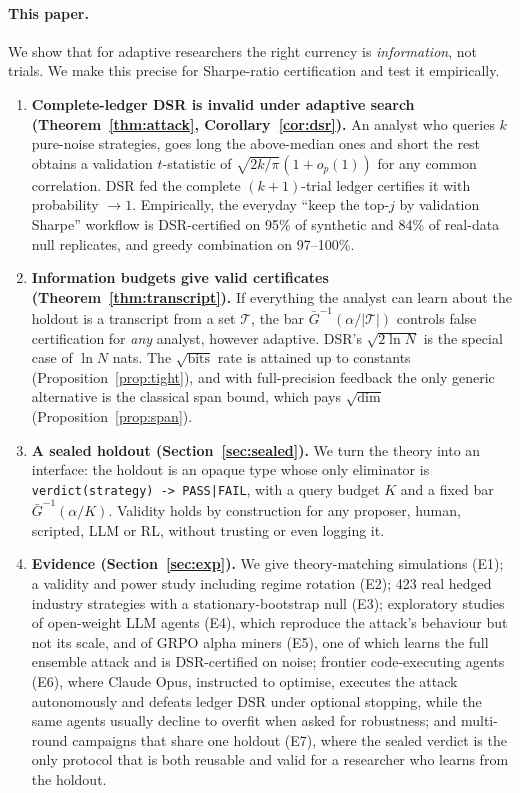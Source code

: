\documentclass[11pt]{article}
\theoremstyle{definition}
\theoremstyle{remark}
\newcommand{\cT}{\mathcal{T}}
\begin{document}
\paragraph{This paper.} We show that for adaptive researchers the right currency is \emph{information}, not trials. We make this precise for Sharpe-ratio certification and test it empirically.
\begin{enumerate}[leftmargin=*,itemsep=2pt]
\item \textbf{Complete-ledger DSR is invalid under adaptive search (Theorem~\ref{thm:attack}, Corollary~\ref{cor:dsr}).} An analyst who queries $k$ pure-noise strategies, goes long the above-median ones and short the rest obtains a validation $t$-statistic of $\sqrt{2k/\pi}(1+o_p(1))$ for any common correlation. DSR fed the complete $(k{+}1)$-trial ledger certifies it with probability $\to1$. Empirically, the everyday ``keep the top-$j$ by validation Sharpe'' workflow is DSR-certified on 95\% of synthetic and 84\% of real-data null replicates, and greedy combination on 97--100\%.
\item \textbf{Information budgets give valid certificates (Theorem~\ref{thm:transcript}).} If everything the analyst can learn about the holdout is a transcript from a set $\cT$, the bar $\bar G^{-1}(\alpha/|\cT|)$ controls false certification for \emph{any} analyst, however adaptive. DSR's $\sqrt{2\ln N}$ is the special case of $\ln N$ nats. The $\sqrt{\text{bits}}$ rate is attained up to constants (Proposition~\ref{prop:tight}), and with full-precision feedback the only generic alternative is the classical span bound, which pays $\sqrt{\dim}$ (Proposition~\ref{prop:span}).
\item \textbf{A sealed holdout (Section~\ref{sec:sealed}).} We turn the theory into an interface: the holdout is an opaque type whose only eliminator is \texttt{verdict(strategy) -> PASS|FAIL}, with a query budget $K$ and a fixed bar $\bar G^{-1}(\alpha/K)$. Validity holds by construction for any proposer, human, scripted, LLM or RL, without trusting or even logging it.
\item \textbf{Evidence (Section~\ref{sec:exp}).} We give theory-matching simulations (E1); a validity and power study including regime rotation (E2); 423 real hedged industry strategies with a stationary-bootstrap null (E3); exploratory studies of open-weight LLM agents (E4), which reproduce the attack's behaviour but not its scale, and of GRPO alpha miners (E5), one of which learns the full ensemble attack and is DSR-certified on noise; frontier code-executing agents (E6), where Claude Opus, instructed to optimise, executes the attack autonomously and defeats ledger DSR under optional stopping, while the same agents usually decline to overfit when asked for robustness; and multi-round campaigns that share one holdout (E7), where the sealed verdict is the only protocol that is both reusable and valid for a researcher who learns from the holdout.
\end{enumerate}
\end{document}

